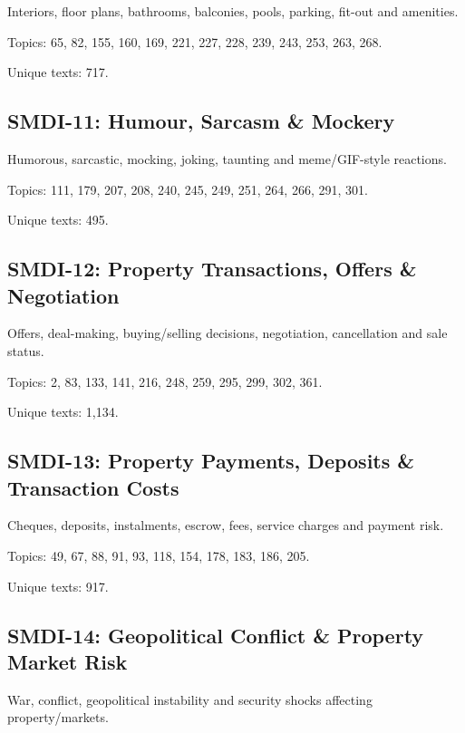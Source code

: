 \documentclass[10pt]{article}
\begin{document}
Interiors, floor plans, bathrooms, balconies, pools, parking, fit-out and amenities.

\par Topics: 65, 82, 155, 160, 169, 221, 227, 228, 239, 243, 253, 263, 268.

\par Unique texts: 717.

\subsection*{SMDI-11: Humour, Sarcasm \& Mockery}

Humorous, sarcastic, mocking, joking, taunting and meme/GIF-style reactions.

\par Topics: 111, 179, 207, 208, 240, 245, 249, 251, 264, 266, 291, 301.

\par Unique texts: 495.

\subsection*{SMDI-12: Property Transactions, Offers \& Negotiation}

Offers, deal-making, buying/selling decisions, negotiation, cancellation and sale status.

\par Topics: 2, 83, 133, 141, 216, 248, 259, 295, 299, 302, 361.

\par Unique texts: 1,134.

\subsection*{SMDI-13: Property Payments, Deposits \& Transaction Costs}

Cheques, deposits, instalments, escrow, fees, service charges and payment risk.

\par Topics: 49, 67, 88, 91, 93, 118, 154, 178, 183, 186, 205.

\par Unique texts: 917.

\subsection*{SMDI-14: Geopolitical Conflict \& Property Market Risk}

War, conflict, geopolitical instability and security shocks affecting property/markets.
\end{document}
